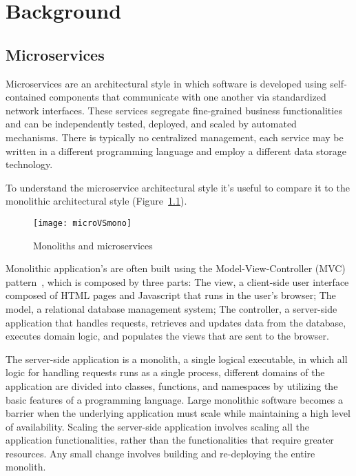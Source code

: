
%

\chapter{Background}
\label{cha:background}

\section{Microservices} %
\label{sec:microservices}

Microservices \cite{microservices, microservices2017tenets, microservicesTomorrow} are an architectural style in which software is developed using self-contained components that
communicate with one another via standardized network interfaces.
These services segregate fine-grained business functionalities and can be independently tested, deployed, and scaled by automated mechanisms.
There is typically no centralized management, each service may be written in a different programming language and employ a different data storage technology.

To understand the microservice architectural style it's useful to compare it to the monolithic architectural style (Figure~\ref{fig:monoliths_and_microservices}).

\begin{figure}[htbp]
    \centering
    \texttt{[image: microVSmono]}
    \caption{Monoliths and microservices \cite{microservices}}
    \label{fig:monoliths_and_microservices}
\end{figure}

Monolithic application's are often built using the Model-View-Controller (MVC) pattern~\cite{mvc}, which is composed by three parts:
The view, a client-side user interface composed of HTML pages and Javascript that runs in the user's browser;
The model, a relational database management system;
The controller, a server-side application that handles requests, retrieves and updates data from the database, executes domain logic,
and populates the views that are sent to the browser.

The server-side application is a monolith, a single logical executable, in which all logic for handling requests runs as a single process,
different domains of the application are divided into classes, functions, and namespaces by utilizing the basic features of a programming language.
Large monolithic software becomes a barrier when the underlying application must scale while maintaining a high level of availability.
Scaling the server-side application involves scaling all the application functionalities, rather than the functionalities that require greater resources.
Any small change involves building and re-deploying the entire monolith.

